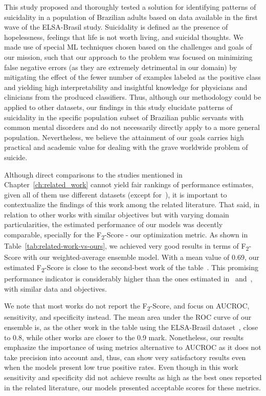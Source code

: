 This study proposed and thoroughly tested a solution for identifying patterns of suicidality in a population of Brazilian adults based on data available in the first wave of the ELSA-Brasil study.
Suicidality is defined as the presence of hopelessness, feelings that life is not worth living, and suicidal thoughts.
We made use of special ML techniques chosen based on the challenges and goals of our mission, such that our approach to the problem was focused on minimizing false negative errors (as they are extremely detrimental in our domain) by mitigating the effect of the fewer number of examples labeled as the positive class and yielding high interpretability and insightful knowledge for physicians and clinicians from the produced classifiers.
Thus, although our methodology could be applied to other datasets, our findings in this study elucidate patterns of suicidality in the specific population subset of Brazilian public servants with common mental disorders and do not necessarily directly apply to a more general population.
Nevertheless, we believe the attainment of our goals carries high practical and academic value for dealing with the grave worldwide problem of suicide.

Although direct comparisons to the studies mentioned in Chapter~\ref{ch:related_work} cannot yield fair rankings of performance estimates, given all of them use different datasets (except for~\citet{Librenza-Garcia2020}), it is important to contextualize the findings of this work among the related literature.
That said, in relation to other works with similar objectives but with varying domain particularities, the estimated performance of our models was decently comparable, specially for the F\textsubscript{2}-Score - our optimization metric.
As shown in Table~\ref{tab:related-work-vs-ours}, we achieved very good results in terms of F\textsubscript{2}-Score with our weighted-average ensemble model.
With a mean value of 0.69, our estimated F\textsubscript{2}-Score is close to the second-best work of the table~\cite{Roy2020}.
This promising performance indicator is considerably higher than the ones estimated in~\citet{Oh2020} and~\cite{Librenza-Garcia2020}, with similar data and objectives.

We note that most works do not report the F\textsubscript{2}-Score, and focus on AUCROC, sensitivity, and specificity instead.
The mean area under the ROC curve of our ensemble is, as the other work in the table using the ELSA-Brasil dataset~\cite{Librenza-Garcia2020}, close to 0.8, while other works are closer to the 0.9 mark.
Nonetheless, our results emphasize the importance of using metrics alternative to AUCROC as it does not take precision into account and, thus, can show very satisfactory results even when the models present low true positive rates.
Even though in this work sensitivity and specificity did not achieve results as high as the best ones reported in the related literature, our models presented acceptable scores for these metrics.

